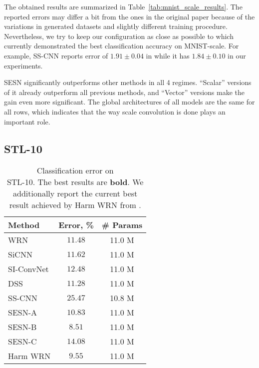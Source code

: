 \documentclass{article} \usepackage{multirow}
\def\Tabref#1{Table~\ref{#1}}
\begin{document}
The obtained results are summarized in \Tabref{tab:mnist_scale_results}. 
The reported errors may differ a bit from the ones in the original paper because of the variations 
in generated datasets and slightly different training procedure. Nevertheless, we try to keep 
our configuration as close as possible to \citet{ghosh2019scale} which currently demonstrated the best 
classification accuracy on MNIST-scale. For example, SS-CNN reports 
error of $1.91\pm0.04$ in \citet{ghosh2019scale} while it has $1.84\pm0.10$ in our experiments.

SESN significantly outperforms other methods in all 4 regimes. ``Scalar''
versions of it already outperform all previous methods, and ``Vector'' versions make the gain even more significant.
The global architectures of all models are the same for all rows, 
which indicates that the way scale convolution is done plays an
important role. 


\subsection{STL-10}

\begin{wraptable}{r}{5.5cm}
        \begin{center}
        \begin{tabular}{l|cc}
        \toprule
        Method      & Error, \%         & \# Params \\ \midrule
        WRN         & $11.48$           & 11.0 M     \\
        SiCNN       & $11.62$           & 11.0 M     \\
        SI-ConvNet  & $12.48$           & 11.0 M     \\
DSS         & $11.28$           & 11.0 M     \\
        SS-CNN      & $25.47$           & 10.8 M     \\ 
        \midrule
        SESN-A        & $10.83$  & 11.0 M     \\
        SESN-B        & $\bm{8.51}$  & 11.0 M     \\
        SESN-C        & $14.08$  & 11.0 M     \\
         \midrule 
        Harm WRN & $9.55$ & 11.0 M \\
        \bottomrule              
        \end{tabular}
        \end{center}
        \caption{Classification error on \\STL-10. The best results are \textbf{bold}.
        We additionally report the current best result achieved by Harm WRN from \citet{ulicny2019harmonic}.}
        \label{tab:stl10}
\end{wraptable} 
\end{document}
